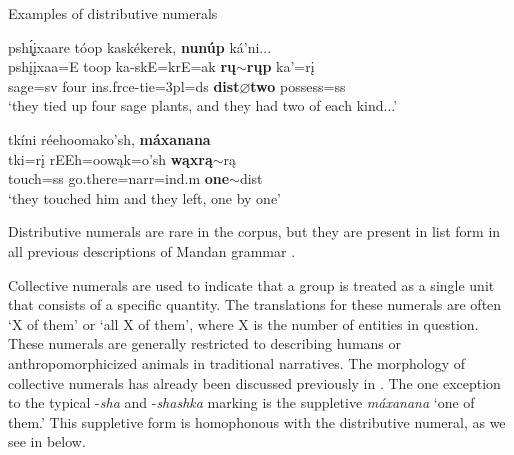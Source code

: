 \begin{exe}

\item\label{ExamplesOfDistributives} Examples of distributive numerals

\begin{xlist}

\item\label{ExamplesOfDistributives1} \glll psh\'{ı̨}įxaare tóop kaskékerek, \textbf{nunúp} ká'ni...\\
    pshįįxaa=E toop ka-skE=krE=ak \textbf{rų$\sim$rųp} ka'=rį\\
    \textnormal{sage}=sv \textnormal{four} ins.frce-\textnormal{tie}=3pl=ds \textbf{dist$\varnothing$\textnormal{\bfseries two}} \textnormal{possess}=ss\\
    \glt `they tied up four sage plants, and they had two of each kind...' \citep[162]{hollow1973a}
    
\item\label{ExamplesOfDistributives2} \glll tkíni réehoomako'sh, \textbf{máxanana}\\
    tki=rį rEEh=oowąk=o'sh \textbf{wąxrą$\sim$}rą\\
    \textnormal{touch}=ss \textnormal{go.there}=narr=ind.m \textnormal{\bfseries one}$\sim$dist\\
    \glt `they touched him and they left, one by one' \citep[261]{hollow1973b}


\end{xlist}

\end{exe}

Distributive numerals are rare in the corpus, but they are present in list form in all previous descriptions of Mandan grammar \citep{kennard1936,hollow1970, mixco1997a}.


\label{SubSubSubCollective}

Collective numerals are used to indicate that a group is treated as a single unit that consists of a specific quantity. The translations for these numerals are often `X of them' or `all X of them', where X is the number of entities in question. These numerals are generally restricted to describing humans or anthropomorphicized animals in traditional narratives. The morphology of collective numerals has already been discussed previously in . The one exception to the typical -\textit{sha} and -\textit{shashka} marking is the suppletive \textit{máxanana} `one of them.' This suppletive form is homophonous with the distributive numeral, as we see in  below.

